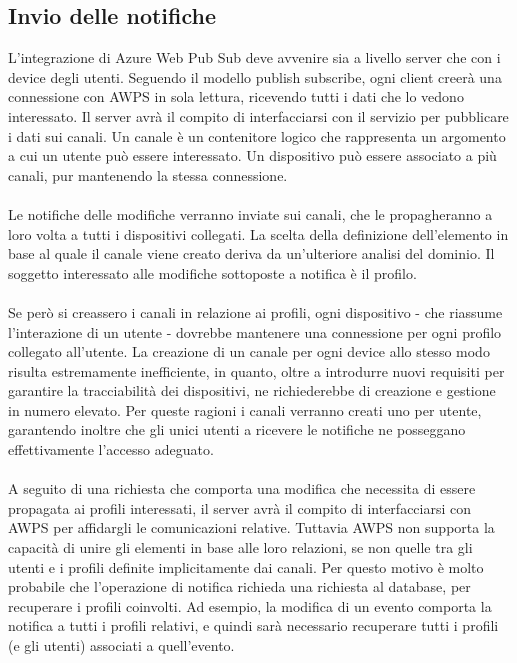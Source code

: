 \subsection{Invio delle notifiche}

L'integrazione di Azure Web Pub Sub deve avvenire
sia a livello server che con i device degli utenti. 
Seguendo il modello publish subscribe, ogni client creerà una connessione con AWPS in sola lettura, 
ricevendo tutti i dati che lo vedono interessato. 
Il server avrà il compito di interfacciarsi con il servizio 
per pubblicare i dati sui canali.
Un canale è un contenitore logico che rappresenta 
un argomento a cui un utente può essere interessato.
Un dispositivo può essere associato a più canali, 
pur mantenendo la stessa connessione.\\
\\
Le notifiche delle modifiche verranno inviate sui canali,
che le propagheranno a loro volta a tutti i dispositivi collegati. 
La scelta della definizione dell'elemento in base al quale il canale viene creato 
deriva da un'ulteriore analisi del dominio. 
Il soggetto interessato alle modifiche sottoposte a notifica è il profilo.\\
\\
Se però si creassero i canali in relazione ai profili,
ogni dispositivo - che riassume l'interazione di un utente -
dovrebbe mantenere una connessione per ogni profilo collegato all'utente. 
La creazione di un canale per ogni device allo stesso modo risulta estremamente inefficiente, 
in quanto, oltre a introdurre nuovi requisiti per garantire la tracciabilità dei dispositivi, 
ne richiederebbe di creazione e gestione in numero elevato. 
Per queste ragioni i canali verranno creati uno per utente, 
garantendo inoltre che gli unici utenti a ricevere 
le notifiche ne posseggano effettivamente l'accesso adeguato.\\
\\
A seguito di una richiesta che comporta una modifica
che necessita di essere propagata ai profili interessati,
il server avrà il compito di interfacciarsi con AWPS per affidargli le comunicazioni relative. 
Tuttavia AWPS non supporta la capacità di unire gli elementi in base alle loro relazioni, 
se non quelle tra gli utenti e i profili definite implicitamente dai canali. 
Per questo motivo è molto probabile che l'operazione di notifica
richieda una richiesta al database, 
per recuperare i profili coinvolti.
Ad esempio, la modifica di un evento comporta la notifica a tutti i profili relativi, 
e quindi sarà necessario recuperare tutti i profili (e gli utenti) associati a quell'evento.\\
